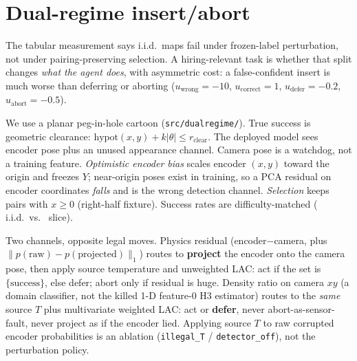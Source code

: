 \documentclass[10pt,twocolumn]{article}
\begin{document}
\section{Dual-regime insert/abort}
The tabular measurement says i.i.d.\ maps fail under frozen-label
perturbation, not under pairing-preserving selection. A hiring-relevant
task is whether that split changes \emph{what the agent does}, with
asymmetric cost: a false-confident insert is much worse than deferring
or aborting ($u_{\mathrm{wrong}}{=}-10$, $u_{\mathrm{correct}}{=}1$,
$u_{\mathrm{defer}}{=}-0.2$, $u_{\mathrm{abort}}{=}-0.5$).

We use a planar peg-in-hole cartoon (\texttt{src/dualregime/}). True
success is geometric clearance: $\mathrm{hypot}(x,y)+k|\theta|\le r_{\mathrm{clear}}$.
The deployed model sees encoder pose plus an unused appearance channel.
Camera pose is a watchdog, not a training feature. \emph{Optimistic
encoder bias} scales encoder $(x,y)$ toward the origin and freezes $Y$;
near-origin poses exist in training, so a PCA residual on encoder
coordinates \emph{falls} and is the wrong detection channel.
\emph{Selection} keeps pairs with $x\ge 0$ (right-half fixture). Success
rates are difficulty-matched (\NumDualPosIid{} i.i.d.\ vs.\
\NumDualPosSel{} slice).

Two channels, opposite legal moves. Physics residual
(encoder$-$camera, plus $\|p(\mathrm{raw})-p(\mathrm{projected})\|_1$)
routes to \textbf{project} the encoder onto the camera pose, then apply
source temperature and unweighted LAC: act if the set is $\{\mathrm{success}\}$,
else defer; abort only if residual is huge. Density ratio on camera
$xy$ (a domain classifier, not the killed 1-D feature-$0$ H3 estimator)
routes to the \emph{same} source $T$ plus multivariate weighted LAC:
act or \textbf{defer}, never abort-as-sensor-fault, never project as if
the encoder lied. Applying source $T$ to raw corrupted encoder
probabilities is an ablation (\texttt{illegal\_T} / \texttt{detector\_off}),
not the perturbation policy.
\end{document}
